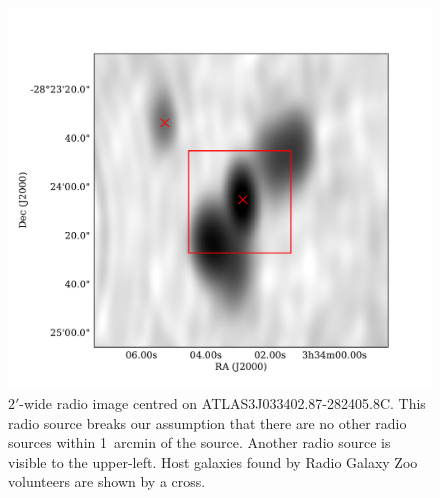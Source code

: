 \documentclass[fleqn,usenatbib,usedcolumn]{mnras}
\begin{document}
     \begin{figure}
      \centering
      \includegraphics[width=\linewidth]{images/CI0077C1_fig.pdf}
      \caption{$2'$-wide radio image centred on ATLAS3\textunderscore{}J033402.87-282405.8C.
        This radio source breaks our assumption that there are no other radio
        sources within 1~arcmin of the source. Another radio source is visible
        to the upper-left. Host galaxies found by Radio Galaxy Zoo volunteers
        are shown by a cross.}
      \label{fig:broken-isolation}
    \end{figure}
\end{document}
